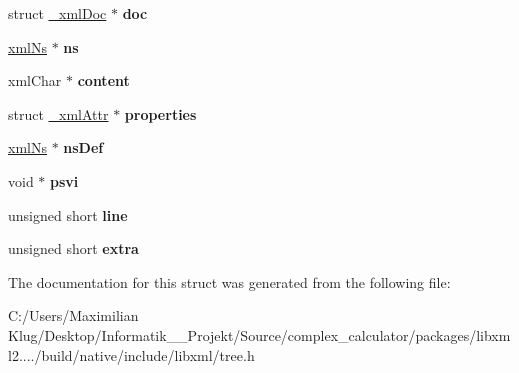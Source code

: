 \begin{DoxyCompactItemize}
struct \mbox{\hyperlink{struct__xml_doc}{\+\_\+xml\+Doc}} $\ast$ {\bfseries doc}
\item 
\mbox{\label{struct__xml_node_af902f75a3ca0a4625af1522fa949ae4a}} 
\mbox{\hyperlink{struct__xml_ns}{xml\+Ns}} $\ast$ {\bfseries ns}
\item 
\mbox{\label{struct__xml_node_a1bc96a50324a7fde5c8f35329c9ab53d}} 
xml\+Char $\ast$ {\bfseries content}
\item 
\mbox{\label{struct__xml_node_a983dfbbe2329d6c47fcbd8a3ca492e70}} 
struct \mbox{\hyperlink{struct__xml_attr}{\+\_\+xml\+Attr}} $\ast$ {\bfseries properties}
\item 
\mbox{\label{struct__xml_node_a64d3a0e8e175d8d9b375ed320fe6d667}} 
\mbox{\hyperlink{struct__xml_ns}{xml\+Ns}} $\ast$ {\bfseries ns\+Def}
\item 
\mbox{\label{struct__xml_node_a5215b42de79182852eecccec81cf362d}} 
void $\ast$ {\bfseries psvi}
\item 
\mbox{\label{struct__xml_node_a77056812e9fe4c79ba512abbccb6c4f9}} 
unsigned short {\bfseries line}
\item 
\mbox{\label{struct__xml_node_a3e7aea99703e467874ce62cff3038f5b}} 
unsigned short {\bfseries extra}
\end{DoxyCompactItemize}


The documentation for this struct was generated from the following file\+:\begin{DoxyCompactItemize}
\item 
C\+:/\+Users/\+Maximilian Klug/\+Desktop/\+Informatik\+\_\+\_\+\+Projekt/\+Source/complex\+\_\+calculator/packages/libxml2..../build/native/include/libxml/tree.\+h\end{DoxyCompactItemize}
